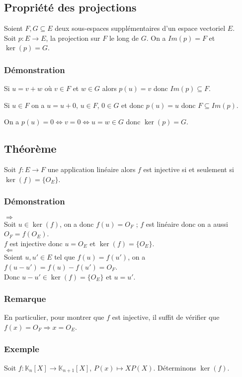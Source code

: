 \documentclass[a4paper,10pt]{book} %
\newcommand{\K}{\mathbb{K}}
\begin{document}
\subsection{Propriété des projections}
Soient $F,G \subseteq E$ deux sous-espaces supplémentaires d'un espace vectoriel $E$.\\
Soit $p : E\rightarrow E$, la projection sur $F$ le long de $G$. On a $Im(p)=F$ et $\ker(p)=G$.

\subsubsection{Démonstration}
Si $u=v+w$ où $v\in F$ et $w\in G$ alors $p(u)=v$ donc $Im(p)\subseteq F$.

Si $u \in F$ on a $u=u+0$, $u\in F$, $0\in G$ et donc $p(u)=u$ donc $F\subseteq Im(p)$.

On a $p(u)=0 \Leftrightarrow v=0  \Leftrightarrow u=w\in G$ donc $\ker(p)=G$.

\newpage

\subsection{Théorème}
Soit $f:E\rightarrow F$ une application linéaire alors $f$ est injective si et seulement si $\ker(f)=\{ O_E \}$.

\subsubsection{Démonstration}
$\Rightarrow$\\
Soit $u\in \ker(f)$, on a donc $f(u)=O_F$ ; $f$ est linéaire donc on a aussi $O_F=f(O_E)$.\\
$f$ est injective donc $u=O_E$ et $\ker(f)=\{ O_E \}$.\\

$\Leftarrow$\\
Soient $u,u' \in E$ tel que $f(u)=f(u')$, on a $f(u-u')=f(u)-f(u')=O_F$.\\
Donc $u-u'\in \ker(f)=\{ O_E \}$ et $u=u'$.

\subsubsection{Remarque}
En particulier, pour montrer que $f$ est injective, il suffit de vérifier que $f(x)=O_F\Rightarrow x=O_E$.

\subsubsection{Exemple}
Soit $f: \K_n[X] \rightarrow \K_{n+1}[X]$, $P(x)\mapsto XP(X)$. Déterminons $\ker(f)$.\\
\end{document}
